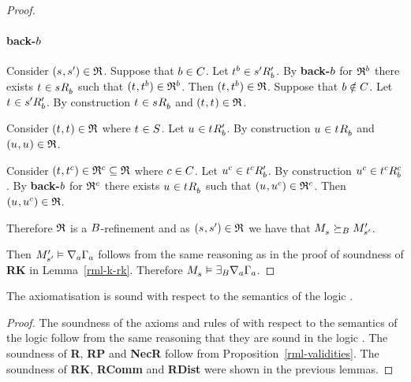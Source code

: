 \begin{proof}
\paragraph{back-$\agentB$}
Consider $(\kStateS, \kStateSP) \in \refinement$.
Suppose that $\agentB \in \agentsC$.
Let $\kStateT[\agentB] \in \kSuccessorsPB{\kStateSP}$.
By {\bf back-$\agentB$} for $\refinement^\agentB$ there exists $\kStateT \in \kSuccessorsB{\kStateS}$ such that $(\kStateT, \kStateT[\agentB]) \in \refinement^\agentB$.
Then $(\kStateT, \kStateT[\agentB]) \in \refinement$.
Suppose that $\agentB \notin \agentsC$.
Let $\kStateT \in \kSuccessorsPB{\kStateSP}$.
By construction $\kStateT \in \kSuccessorsB{\kStateS}$ and $(\kStateT, \kStateT) \in \refinement$.

Consider $(\kStateT, \kStateT) \in \refinement$ where $\kStateT \in \kStates$.
Let $\kStateU \in \kSuccessorsPB{\kStateT}$.
By construction $\kStateU \in \kSuccessorsB{\kStateT}$ and $(\kStateU, \kStateU) \in \refinement$.

Consider $(\kStateT, \kStateT[\agentC]) \in \refinement^\agentC \subseteq \refinement$ where $\agentC \in \agentsC$.
Let $\kStateU[\agentC] \in \kSuccessorsPB{\kStateT[\agentC]}$.
By construction $\kStateU[\agentC] \in \kSuccessorsB[\agentC]{\kStateT[\agentC]}$.
By {\bf back-$\agentB$} for $\refinement^\agentC$ there exists $\kStateU \in \kSuccessorsB{\kStateT}$ such that $(\kStateU, \kStateU[\agentC]) \in \refinement^\agentC$.
Then $(\kStateU, \kStateU[\agentC]) \in \refinement$.

Therefore $\refinement$ is a $\agentsB$-refinement and as $(\kStateS, \kStateSP) \in \refinement$ we have that $\kPModel{\kStateS} \simulatesBs \kPModelP{\kStateSP}$.

Then $\kPModelP{\kStateSP} \entails \coversA \Gamma_\agentA$ follows from the same reasoning as in the proof of soundness of {\bf RK} in Lemma~\ref{rml-k-rk}.
Therefore $\kPModel{\kStateS} \entails \somerefsBs \coversA \Gamma_\agentA$.
\end{proof}

\begin{lemma}\label{rml-k-sound}
The axiomatisation \axiomRmlK{} is sound with respect to the semantics of the logic \logicRmlK{}.
\end{lemma}

\begin{proof}
The soundness of the axioms and rules of \axiomK{} with respect to the semantics of the logic \logicRmlK{} follow from the same reasoning that they are sound in the logic \logicK{}.
The soundness of {\bf R}, {\bf RP} and {\bf NecR} follow from Proposition~\ref{rml-validities}.
The soundness of {\bf RK}, {\bf RComm} and {\bf RDist} were shown in the previous lemmas.
\end{proof}

